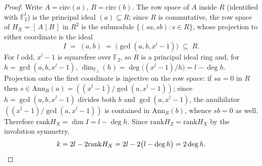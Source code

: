 \documentclass[10pt,a4paper]{amsart}
\newcommand{\F}{\mathbb{F}}
\newcommand{\rank}{\mathrm{rank}}
\begin{document}
\begin{proof}
Write $A=\mathrm{circ}(a)$, $B=\mathrm{circ}(b)$. The row space of $A$
inside $R$ (identified with $\F_2^{l}$) is the principal ideal $(a)\subseteq
R$; since $R$ is commutative, the row space of $H_X=[\,A\mid B\,]$ in
$R^2$ is the submodule $\{(sa,sb):s\in R\}$, whose projection to either
coordinate is the ideal
\[
I\;=\;(a,b)\;=\;\bigl(\gcd(a,b,x^{l}-1)\bigr)\;\subseteq\; R .
\]
For $l$ odd, $x^{l}-1$ is squarefree over $\F_2$, so $R$ is a principal
ideal ring and, for $h=\gcd(a,b,x^{l}-1)$,
$\dim_{\F_2}(h)=\deg\!\big((x^{l}-1)/h\big)=l-\deg h$. Projection onto the
first coordinate is injective on the row space: if $sa=0$ in $R$ then
$s\in\mathrm{Ann}_R(a)=((x^{l}-1)/\gcd(a,x^{l}-1))$; since
$h=\gcd(a,b,x^{l}-1)$ divides both $b$ and $\gcd(a,x^{l}-1)$, the annihilator
$((x^{l}-1)/\gcd(a,x^{l}-1))$ is contained in $\mathrm{Ann}_R(b)$, whence
$sb=0$ as well. Therefore $\rank H_X=\dim I=l-\deg h$. Since
$\rank H_Z=\rank H_X$ by the involution symmetry,
\[
k=2l-2\rank H_X=2l-2\bigl(l-\deg h\bigr)=2\deg h. \qedhere
\]
\end{proof}
\end{document}
